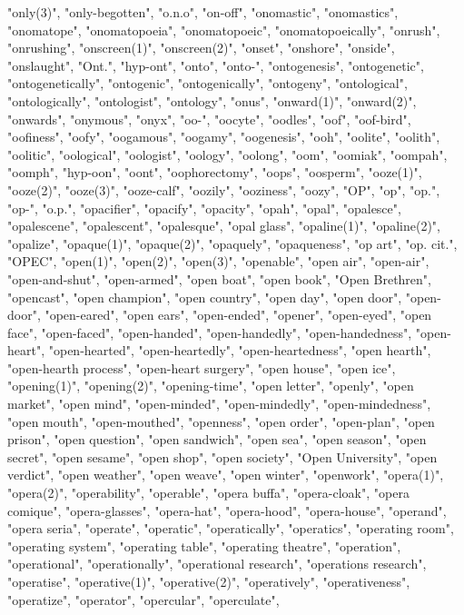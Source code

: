 "only(3)",
"only-begotten",
"o.n.o",
"on-off",
"onomastic",
"onomastics",
"onomatope",
"onomatopoeia",
"onomatopoeic",
"onomatopoeically",
"onrush",
"onrushing",
"onscreen(1)",
"onscreen(2)",
"onset",
"onshore",
"onside",
"onslaught",
"Ont.",
"hyp-ont",
"onto",
"onto-",
"ontogenesis",
"ontogenetic",
"ontogenetically",
"ontogenic",
"ontogenically",
"ontogeny",
"ontological",
"ontologically",
"ontologist",
"ontology",
"onus",
"onward(1)",
"onward(2)",
"onwards",
"onymous",
"onyx",
"oo-",
"oocyte",
"oodles",
"oof",
"oof-bird",
"oofiness",
"oofy",
"oogamous",
"oogamy",
"oogenesis",
"ooh",
"oolite",
"oolith",
"oolitic",
"oological",
"oologist",
"oology",
"oolong",
"oom",
"oomiak",
"oompah",
"oomph",
"hyp-oon",
"oont",
"oophorectomy",
"oops",
"oosperm",
"ooze(1)",
"ooze(2)",
"ooze(3)",
"ooze-calf",
"oozily",
"ooziness",
"oozy",
"OP",
"op",
"op.",
"op-",
"o.p.",
"opacifier",
"opacify",
"opacity",
"opah",
"opal",
"opalesce",
"opalescene",
"opalescent",
"opalesque",
"opal glass",
"opaline(1)",
"opaline(2)",
"opalize",
"opaque(1)",
"opaque(2)",
"opaquely",
"opaqueness",
"op art",
"op. cit.",
"OPEC",
"open(1)",
"open(2)",
"open(3)",
"openable",
"open air",
"open-air",
"open-and-shut",
"open-armed",
"open boat",
"open book",
"Open Brethren",
"opencast",
"open champion",
"open country",
"open day",
"open door",
"open-door",
"open-eared",
"open ears",
"open-ended",
"opener",
"open-eyed",
"open face",
"open-faced",
"open-handed",
"open-handedly",
"open-handedness",
"open-heart",
"open-hearted",
"open-heartedly",
"open-heartedness",
"open hearth",
"open-hearth process",
"open-heart surgery",
"open house",
"open ice",
"opening(1)",
"opening(2)",
"opening-time",
"open letter",
"openly",
"open market",
"open mind",
"open-minded",
"open-mindedly",
"open-mindedness",
"open mouth",
"open-mouthed",
"openness",
"open order",
"open-plan",
"open prison",
"open question",
"open sandwich",
"open sea",
"open season",
"open secret",
"open sesame",
"open shop",
"open society",
"Open University",
"open verdict",
"open weather",
"open weave",
"open winter",
"openwork",
"opera(1)",
"opera(2)",
"operability",
"operable",
"opera buffa",
"opera-cloak",
"opera comique",
"opera-glasses",
"opera-hat",
"opera-hood",
"opera-house",
"operand",
"opera seria",
"operate",
"operatic",
"operatically",
"operatics",
"operating room",
"operating system",
"operating table",
"operating theatre",
"operation",
"operational",
"operationally",
"operational research",
"operations research",
"operatise",
"operative(1)",
"operative(2)",
"operatively",
"operativeness",
"operatize",
"operator",
"opercular",
"operculate",
